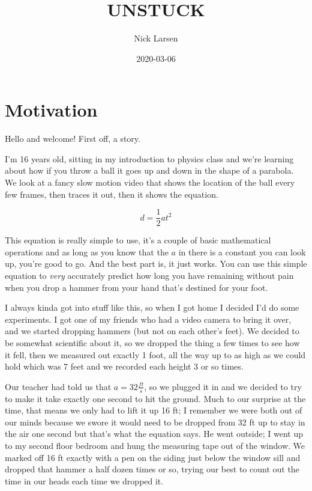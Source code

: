 \documentclass[]{book}
\title{UNSTUCK}
\author{Nick Larsen}
\date{2020-03-06}
\begin{document}
\maketitle

{
\setcounter{tocdepth}{1}
\tableofcontents
}
\chapter*{Motivation}\label{motivation}

Hello and welcome! First off, a story.

I'm 16 years old, sitting in my introduction to physics class and we're
learning about how if you throw a ball it goes up and down in the shape
of a parabola. We look at a fancy slow motion video that shows the
location of the ball every few frames, then traces it out, then it shows
the equation.

\[d = \frac{1}{2}at^2\]

This equation is really simple to use, it's a couple of basic
mathematical operations and as long as you know that the \(a\) in there
is a constant you can look up, you're good to go. And the best part is,
it just works. You can use this simple equation to \emph{very}
accurately predict how long you have remaining without pain when you
drop a hammer from your hand that's destined for your foot.

I always kinda got into stuff like this, so when I got home I decided
I'd do some experiments. I got one of my friends who had a video camera
to bring it over, and we started dropping hammers (but not on each
other's feet). We decided to be somewhat scientific about it, so we
dropped the thing a few times to see how it fell, then we measured out
exactly 1 foot, all the way up to as high as we could hold which was 7
feet and we recorded each height 3 or so times.

Our teacher had told us that \(a = 32\frac{ft}{s}\), so we plugged it in
and we decided to try to make it take exactly one second to hit the
ground. Much to our surprise at the time, that means we only had to lift
it up 16 ft; I remember we were both out of our minds because we swore
it would need to be dropped from 32 ft up to stay in the air one second
but that's what the equation says. He went outside; I went up to my
second floor bedroom and hung the measuring tape out of the window. We
marked off 16 ft exactly with a pen on the siding just below the window
sill and dropped that hammer a half dozen times or so, trying our best
to count out the time in our heads each time we dropped it.
\end{document}
